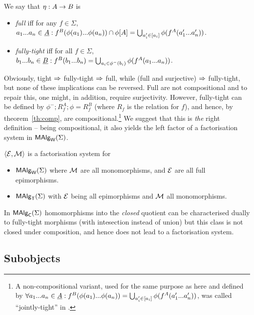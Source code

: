 \documentclass[10pt]{article}
\begin{document}
\begin{Definition}
\label{de:jtight}
We say that  $\eta:A\rightarrow B$ is
\begin{itemize}\MyLPar
\item
{\em full} iff for any $f \in \Sigma$,
$a_{1}...a_{n}\in\underline {A} : f^B(\phi(a_{1})...\phi(a_{n})) \cap \phi[A] = 
   \bigcup_{a'_{i}\in [a_{i}]} \phi(f^A(a'_{1}...a'_{n}))$.
\item
{\em fully-tight} iff for all $f\in\Sigma$,
$b_{1}...b_{n}\in\underline {B} : f^B(b_{1}...b_{n}) = \bigcup_{a_{i}\in \phi^{-}(b_{i})} \phi(f^A(a_{1}...a_{n}))$.
\end{itemize}
\end{Definition}
%
Obviously, tight $\Rightarrow$ fully-tight $\Rightarrow$ full, while (full and
surjective) $\Rightarrow$ fully-tight, but none of these implications can be
reversed.  Full are not compositional and to repair this, one might,
in addition, require surjectivity.  However, fully-tight can be
defined by $\phi^-;R^A_f;\phi=R^B_f$ (where $R_f$ is the relation for
$f$), and hence, by theorem~\ref{th:comp}, are
compositional.\footnote{A non-compositional variant, used for the same
purpose as here and defined by $\forall a_{1}...a_{n}\in\underline {A}:f^B(\phi(a_{1})...\phi(a_{n})) = \bigcup_{a'_{i}\in [a_{i}]} \phi(f^A(a'_{1}...a'_{n}))$, was
called ``jointly-tight'' in \cite{c:132}.}  We suggest that this is
{\em the} right definition -- being compositional, it also yields the
left factor of a factorisation system in $\mbox{\rm\sf MAlg}_{\sf W}(\Sigma)$.

\begin{Theorem}
\label{le:FSl}\label{le:FSt}
$\langle{\cal E},{\cal M}\rangle$ is a factorisation system for 
\begin{itemize}\MyLPar
\item $\mbox{\rm\sf MAlg}_{\sf W}(\Sigma)$ where ${\cal M}$ are all monomorphisms, and ${\cal E}$ are all full
epimorphisms.
\item
$\mbox{\rm\sf MAlg}_{\sf T}(\Sigma)$ with ${\cal E}$ being all epimorphisms and ${\cal M}$ all monomorphisms.
\end{itemize}
\end{Theorem}
%
In $\mbox{\rm\sf MAlg}_{\sf C}(\Sigma)$ homomorphisms into the {\em closed} quotient can be
characterised dually to fully-tight morphisms (with intesection
instead of union) but this class is not closed under composition, and
hence does not lead to a factorisation system.



\subsection{Subobjects}
\label{sub:sub}
\end{document}
